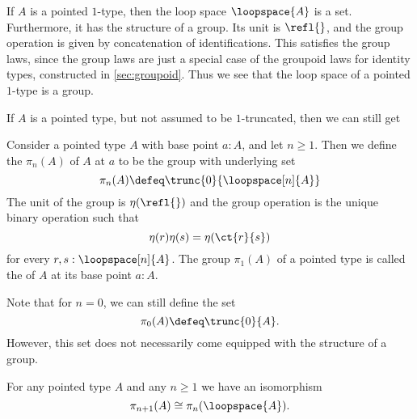 \begin{eg}\label{eg:loop-spaces}
  If $A$ is a pointed $1$-type, then the loop space $\loopspace{A}$ is a set. Furthermore, it has the structure of a group. Its unit is $\refl{}$, and the group operation is given by concatenation of identifications. This satisfies the group laws, since the group laws are just a special case of the groupoid laws for identity types, constructed in \cref{sec:groupoid}. Thus we see that the loop space of a pointed $1$-type is a group.
\end{eg}

If $A$ is a pointed type, but not assumed to be $1$-truncated, then we can still get 

\begin{defn}
  Consider a pointed type $A$ with base point $a:A$, and let $n\geq 1$. Then we define the  $\pi_n(A)$ of $A$ at $a$ to be the group with underlying set
  \begin{equation*}
    \pi_n(A)\defeq\trunc{0}{\loopspace[n]{A}}
  \end{equation*}
  The unit of the group is $\eta(\refl{})$ and the group operation is the unique binary operation such that
  \begin{equation*}
    \eta(r)\eta(s)=\eta(\ct{r}{s})
  \end{equation*}
  for every $r,s:\loopspace[n]{A}$. The group $\pi_1(A)$ of a pointed type is called the  of $A$ at its base point $a:A$.
\end{defn}

\begin{rmk}
  Note that for $n=0$, we can still define the set
  \begin{equation*}
    \pi_0(A)\defeq\trunc{0}{A}.
  \end{equation*}
  However, this set does not necessarily come equipped with the structure of a group.
\end{rmk}

\begin{prp}\label{prp:homotopy-group-loop-space}
  For any pointed type $A$ and any $n\geq 1$ we have an isomorphism
  \begin{equation*}
    \pi_{n+1}(A)\cong \pi_n(\loopspace{A}).
  \end{equation*}
\end{prp}

